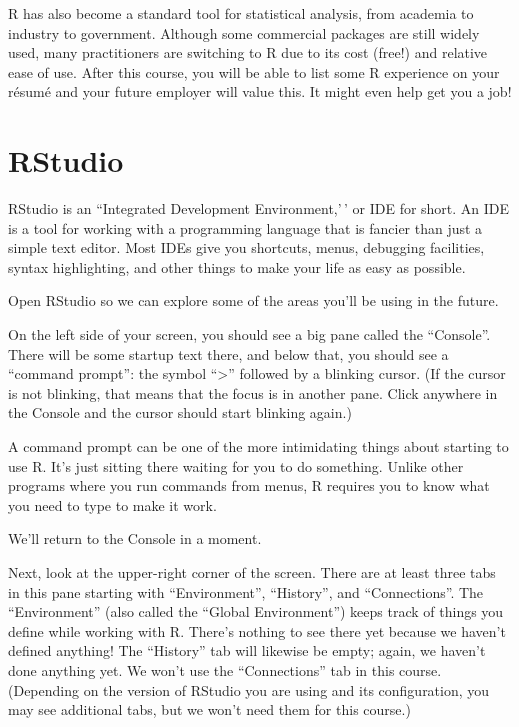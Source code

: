 \documentclass[
]{book}
\begin{document}
R has also become a standard tool for statistical analysis, from academia to industry to government. Although some commercial packages are still widely used, many practitioners are switching to R due to its cost (free!) and relative ease of use. After this course, you will be able to list some R experience on your résumé and your future employer will value this. It might even help get you a job!

\hypertarget{intror-rstudio}{%
\section{RStudio}\label{intror-rstudio}}

RStudio is an ``Integrated Development Environment,'\,' or IDE for short. An IDE is a tool for working with a programming language that is fancier than just a simple text editor. Most IDEs give you shortcuts, menus, debugging facilities, syntax highlighting, and other things to make your life as easy as possible.

Open RStudio so we can explore some of the areas you'll be using in the future.

On the left side of your screen, you should see a big pane called the ``Console''. There will be some startup text there, and below that, you should see a ``command prompt'': the symbol ``\textgreater{}'' followed by a blinking cursor. (If the cursor is not blinking, that means that the focus is in another pane. Click anywhere in the Console and the cursor should start blinking again.)

A command prompt can be one of the more intimidating things about starting to use R. It's just sitting there waiting for you to do something. Unlike other programs where you run commands from menus, R requires you to know what you need to type to make it work.

We'll return to the Console in a moment.

Next, look at the upper-right corner of the screen. There are at least three tabs in this pane starting with ``Environment'', ``History'', and ``Connections''. The ``Environment'' (also called the ``Global Environment'') keeps track of things you define while working with R. There's nothing to see there yet because we haven't defined anything! The ``History'' tab will likewise be empty; again, we haven't done anything yet. We won't use the ``Connections'' tab in this course. (Depending on the version of RStudio you are using and its configuration, you may see additional tabs, but we won't need them for this course.)
\end{document}
